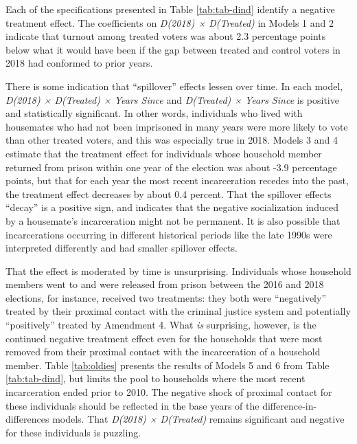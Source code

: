 \documentclass[
  12pt,
]{article}
\begin{document}
Each of the specifications presented in Table \ref{tab:tab-dind} identify a negative treatment effect. The coefficients on \emph{D(2018) × D(Treated)} in Models 1 and 2 indicate that turnout among treated voters was about 2.3 percentage points below what it would have been if the gap between treated and control voters in 2018 had conformed to prior years.

There is some indication that ``spillover'' effects lessen over time. In each model, \emph{D(2018) × D(Treated) × Years Since} and \emph{D(Treated) × Years Since} is positive and statistically significant. In other words, individuals who lived with housemates who had not been imprisoned in many years were more likely to vote than other treated voters, and this was especially true in 2018. Models 3 and 4 estimate that the treatment effect for individuals whose household member returned from prison within one year of the election was about -3.9 percentage points, but that for each year the most recent incarceration recedes into the past, the treatment effect decreases by about 0.4 percent. That the spillover effects ``decay'' is a positive sign, and indicates that the negative socialization induced by a housemate's incarceration might not be permanent. It is also possible that incarcerations occurring in different historical periods like the late 1990s were interpreted differently and had smaller spillover effects.

That the effect is moderated by time is unsurprising. Individuals whose household members went to and were released from prison between the 2016 and 2018 elections, for instance, received two treatments: they both were ``negatively'' treated by their proximal contact with the criminal justice system and potentially ``positively'' treated by Amendment 4. What \emph{is} surprising, however, is the continued negative treatment effect even for the households that were most removed from their proximal contact with the incarceration of a household member. Table \ref{tab:oldies} presents the results of Models 5 and 6 from Table \ref{tab:tab-dind}, but limits the pool to households where the most recent incarceration ended prior to 2010. The negative shock of proximal contact for these individuals should be reflected in the base years of the difference-in-differences models. That \emph{D(2018) × D(Treated)} remains significant and negative for these individuals is puzzling.

\begin{singlespace}

\end{singlespace}
\end{document}
